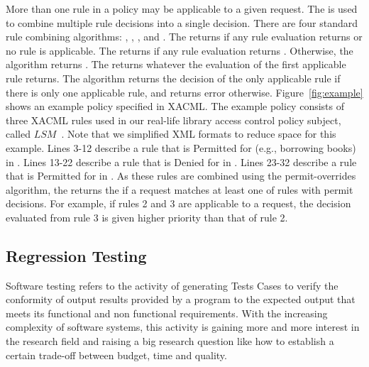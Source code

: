 More than one rule in a policy may be applicable to a given request.
The  is used to combine multiple
rule decisions into a single decision. There are four standard rule
combining algorithms: , , , and . The
 returns  if any rule
evaluation returns  or no rule is applicable. The
 returns  if any
rule evaluation returns . Otherwise, the algorithm
returns .
The  returns whatever the
evaluation of the first applicable rule returns. The
 algorithm returns the decision of the only
applicable rule if there is only one applicable rule, and returns
error otherwise.
Figure~\ref{fig:example} shows an example policy specified
in XACML. The example policy consists of three XACML rules used in our real-life library access
control policy subject, called $LSM$~\cite{mouelhi09:tranforming}.
Note that we simplified XML formats to reduce
space for this example.
Lines 3-12 describe a rule that  is Permitted for   (e.g., borrowing books) in .
Lines 13-22 describe
a rule that  is Denied for   in .
Lines 23-32 describe
a rule that  is Permitted for   in .
As these rules are combined using the permit-overrides
algorithm, the  returns the
 if a request matches at least one of
rules with permit decisions. For example, if rules 2 and 3 are applicable to a request, the decision
evaluated from rule 3 is given higher priority than that of rule 2.


\subsection{Regression Testing}
Software testing \cite{Myers:1979:AST:539883} refers to the activity of generating Tests Cases to verify the conformity of output results provided by a 
program to the expected output that meets its functional and non functional requirements. With the increasing complexity of software systems, 
this activity is gaining more and more interest in the research field and raising a big research question like how to establish a certain trade-off between budget, 
time and quality. 


